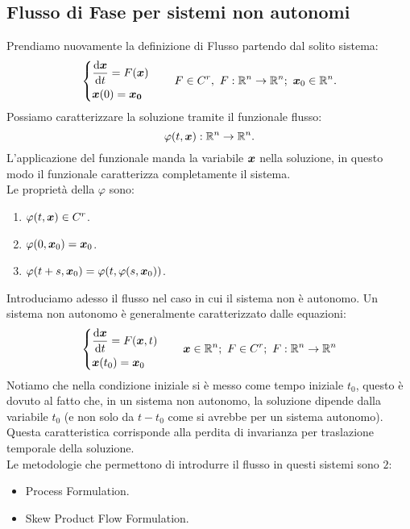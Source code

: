 \subsection{Flusso di Fase per sistemi non autonomi}%
\label{sub:Flusso di Fase per sistemi non autonomi}
Prendiamo nuovamente la definizione di Flusso partendo dal solito sistema:
\[
    \begin{dcases}
	\frac{\text{d} \boldsymbol{x}}{\text{d} t} = F(\boldsymbol{x})\\
	\boldsymbol{x} (0)=\boldsymbol{x_0}
    \end{dcases}
    \qquad 
    F \in C^r, \ F:\mathbb{R}^n\to \mathbb{R}^n; \ \boldsymbol{x}_0 \in \mathbb{R}^n
.\] 
Possiamo caratterizzare la soluzione tramite il funzionale flusso:
\[
    \varphi (t,\boldsymbol{x}): \mathbb{R}^n\to \mathbb{R}^n
.\] 
L'applicazione del funzionale manda la variabile $\boldsymbol{x}$ nella soluzione, in questo modo il funzionale caratterizza completamente il sistema.\\
Le proprietà della $\varphi$ sono:
\begin{enumerate}
    \item $\varphi (t, \boldsymbol{x}) \in C^r$.
    \item $\varphi (0, \boldsymbol{x}_0) = \boldsymbol{x}_0$.
    \item $\varphi (t + s, \boldsymbol{x}_0) = \varphi (t, \varphi (s, \boldsymbol{x}_0))$.
\end{enumerate}
Introduciamo adesso il flusso nel caso in cui il sistema non è autonomo. Un sistema non autonomo è generalmente caratterizzato dalle equazioni:
\[
    \begin{dcases}
	\frac{\text{d} \boldsymbol{x}}{\text{d} t} = F(\boldsymbol{x}, t)\\
	\boldsymbol{x}(t_0) = \boldsymbol{x}_0
    \end{dcases}
    \qquad 
    \boldsymbol{x} \in \mathbb{R}^n; \ F \in C^r; \ F: \mathbb{R}^n\to \mathbb{R}^n
\] 
Notiamo che nella condizione iniziale si è messo come tempo iniziale $t_0$, questo è dovuto al fatto che, in un sistema non autonomo, la soluzione dipende dalla variabile $t_0$ (e non solo da $t-t_0$ come si avrebbe per un sistema autonomo). Questa caratteristica corrisponde alla perdita di invarianza per traslazione temporale della soluzione.\\
Le metodologie che permettono di introdurre il flusso in questi sistemi sono $2$:
\begin{itemize}
    \item Process Formulation.
    \item Skew Product Flow Formulation.
\end{itemize}
